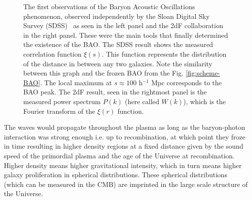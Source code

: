 \begin{figure}[t] \centering
	\hspace{0.2pt}
	\caption[First BAO observations by the SDSS and the 2dF collaborations.]{The first observations of the Baryon Acoustic Oscillations phenomenon, observed independently by the Sloan Digital Sky Survey (SDSS)~\cite{Eisenstein2005} as seen in the left panel and the 2dF collaboration~\cite{2dFCole2005} in the right panel. These were the main tools that finally determined the existence of the BAO. The SDSS result shows the measured correlation function $\xi(s)$. This function represents the distribution of the distance in between any two galaxies. Note the similarity between this graph and the frozen BAO from the Fig. \ref{fig:scheme-BAO}. The local maximum at $s\approx 100$ h$^{-1}$ Mpc corresponds to the BAO peak. The 2dF result, seen in the rightmost panel is the measured power spectrum $P(k)$ (here called  $W(k)$), which is the Fourier transform of the $\xi(r)$ function.}
	\label{fig:2005-results}
\end{figure}
The waves would propagate throughout the plasma as long as the baryon-photon interaction was strong enough i.e. up to recombination, at which point they froze in time resulting in higher density regions at a fixed distance given by the sound speed of the primordial plasma and the age of the Universe at recombination. Higher density means higher gravitational intensity, which in turn means higher galaxy proliferation in spherical distributions. These spherical distributions (which can be measured in the CMB) are imprinted in the large scale structure of the Universe. \\

